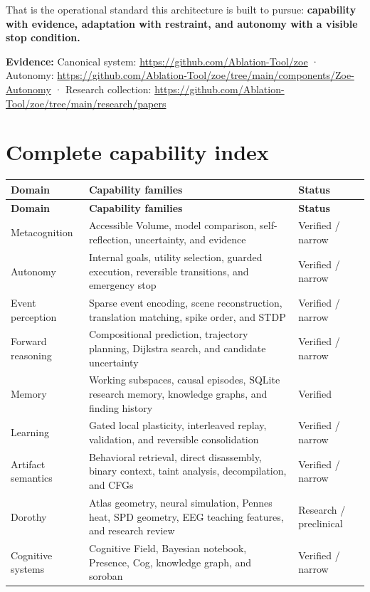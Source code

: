 \documentclass[11pt]{article}
\newcommand{\evidence}[1]{\par\smallskip\small\color{ZoeGray}\textbf{Evidence:} #1\normalsize\par\smallskip}
\begin{document}
That is the operational standard this architecture is built to pursue: \textbf{capability with evidence, adaptation with restraint, and autonomy with a visible stop condition.}

\evidence{Canonical system: \url{https://github.com/Ablation-Tool/zoe} · Autonomy: \url{https://github.com/Ablation-Tool/zoe/tree/main/components/Zoe-Autonomy} · Research collection: \url{https://github.com/Ablation-Tool/zoe/tree/main/research/papers}}

\clearpage
\appendix
\section{Complete capability index}

\begin{longtable}{p{}p{}p{}}
\toprule
\textbf{Domain} & \textbf{Capability families} & \textbf{Status}\\
\midrule
\endfirsthead
\toprule
\textbf{Domain} & \textbf{Capability families} & \textbf{Status}\\
\midrule
\endhead
Metacognition & Accessible Volume, model comparison, self-reflection, uncertainty, and evidence & Verified / narrow\\
Autonomy & Internal goals, utility selection, guarded execution, reversible transitions, and emergency stop & Verified / narrow\\
Event perception & Sparse event encoding, scene reconstruction, translation matching, spike order, and STDP & Verified / narrow\\
Forward reasoning & Compositional prediction, trajectory planning, Dijkstra search, and candidate uncertainty & Verified / narrow\\
Memory & Working subspaces, causal episodes, SQLite research memory, knowledge graphs, and finding history & Verified\\
Learning & Gated local plasticity, interleaved replay, validation, and reversible consolidation & Verified / narrow\\
Artifact semantics & Behavioral retrieval, direct disassembly, binary context, taint analysis, decompilation, and CFGs & Verified / narrow\\
Dorothy & Atlas geometry, neural simulation, Pennes heat, SPD geometry, EEG teaching features, and research review & Research / preclinical\\
Cognitive systems & Cognitive Field, Bayesian notebook, Presence, Cog, knowledge graph, and soroban & Verified / narrow\\

\end{longtable}
\end{document}
